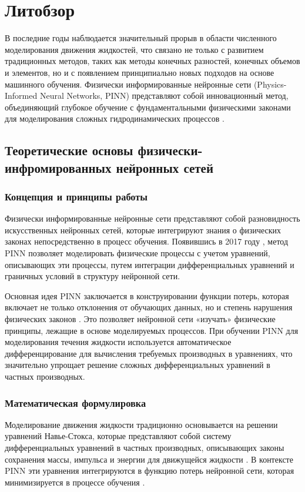 \chapter{Литобзор}

В последние годы наблюдается значительный прорыв в области численного моделирования движения жидкостей,
что связано не только с развитием традиционных методов, таких как методы конечных разностей, конечных
объемов и элементов, но и с появлением принципиально новых подходов на основе машинного обучения.
Физически информированные нейронные сети (Physics-Informed Neural Networks, PINN) представляют собой
инновационный метод, объединяющий глубокое обучение с фундаментальными физическими законами для
моделирования сложных гидродинамических процессов \cite{raissi2019physics}.

\section{Теоретические основы физически-инфромированных нейронных сетей}
\subsection{Концепция и принципы работы}
Физически информированные нейронные сети представляют собой разновидность искусственных нейронных сетей,
которые интегрируют знания о физических законах непосредственно в процесс обучения. Появившись в 2017
году \cite{raissi2017physics}, метод PINN позволяет моделировать физические процессы с учетом уравнений,
описывающих эти процессы, путем интеграции дифференциальных уравнений и граничных условий в структуру
нейронной сети.

Основная идея PINN заключается в конструировании функции потерь, которая включает не только отклонения
от обучающих данных, но и степень нарушения физических законов \cite{karniadakis2021physics}. Это
позволяет нейронной сети «изучать» физические принципы, лежащие в основе моделируемых процессов. При
обучении PINN для моделирования течения жидкости используется автоматическое дифференцирование для
вычисления требуемых производных в уравнениях, что значительно упрощает решение сложных дифференциальных
уравнений в частных производных.

\subsection{Математическая формулировка}
Моделирование движения жидкости традиционно основывается на решении уравнений Навье-Стокса, которые
представляют собой систему дифференциальных уравнений в частных производных, описывающих законы сохранения
массы, импульса и энергии для движущейся жидкости \cite{batchelor2000introduction}. В контексте PINN эти
уравнения интегрируются в функцию потерь нейронной сети, которая минимизируется в процессе
обучения \cite{yang2019adversarial}.

